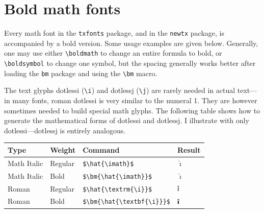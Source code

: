 \documentclass[\fsc]{article}
\theoremstyle{oldplain}
\theoremstyle{plain}
\begin{document}
\section{Bold math fonts}\label{sec:boldmath}
Every math font in the {\tt txfonts} package, and in the {\tt newtx} package, is accompanied by a bold version. Some usage examples are given below. Generally, one may use either \verb|\boldmath| to change an entire formula to bold, or \verb|\boldsymbol| to change one symbol, but the spacing generally works better after loading the {\tt bm} package and using the \verb|\bm| macro.

The text glyphs dotlessi (\verb|\i|) and dotlessj (\verb|\j|) are rarely needed in actual text---in many fonts, roman dotlessi is very similar to the numeral 1. They are however sometimes needed to build special math glyphs. The following table shows how to generate the mathematical forms of dotlessi and dotlessj. I illustrate with only dotlessi---dotlessj is entirely analogous.

\begin{center}
  \begin{tabular}{@{} llll @{}}
    \hline
    Type & Weight & Command & Result \\ 
    \hline
    Math Italic & Regular & \verb|$\hat{\imath}$| & $\hat{\imath}$ \\ 
    Math Italic & Bold & \verb|$\bm{\hat{\imath}}$| & $\bm{\hat{\imath}}$ \\ 
    Roman & Regular & \verb|$\hat{\textrm{\i}}$| & $\hat{\textrm{\i}}$\\ 
    Roman & Bold & \verb|$\bm{\hat{\textbf{\i}}}$| & $\bm{\hat{\textbf{\i}}}$\\ 
    \hline
  \end{tabular}
\end{center}
\end{document}
